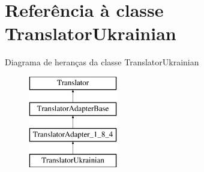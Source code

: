 \hypertarget{class_translator_ukrainian}{\section{Referência à classe Translator\-Ukrainian}
\label{class_translator_ukrainian}
}
Diagrama de heranças da classe Translator\-Ukrainian\begin{figure}[H]
\begin{center}
\leavevmode
\includegraphics[height=4.000000cm]{class_translator_ukrainian}
\end{center}
\end{figure}
